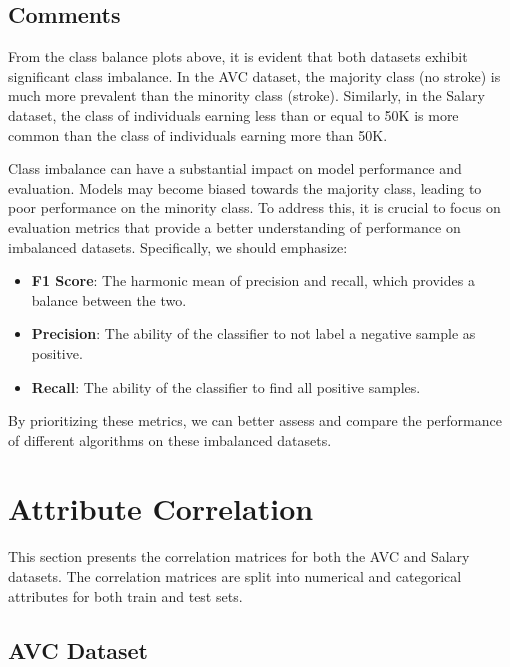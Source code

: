 \documentclass[a4paper,12pt]{article}
\begin{document}
\subsection{Comments}
From the class balance plots above, it is evident that both datasets exhibit significant class imbalance. In the AVC dataset, the majority class (no stroke) is much more prevalent than the minority class (stroke). Similarly, in the Salary dataset, the class of individuals earning less than or equal to 50K is more common than the class of individuals earning more than 50K.

Class imbalance can have a substantial impact on model performance and evaluation. Models may become biased towards the majority class, leading to poor performance on the minority class. To address this, it is crucial to focus on evaluation metrics that provide a better understanding of performance on imbalanced datasets. Specifically, we should emphasize:

\begin{itemize}
    \item \textbf{F1 Score}: The harmonic mean of precision and recall, which provides a balance between the two.
    \item \textbf{Precision}: The ability of the classifier to not label a negative sample as positive.
    \item \textbf{Recall}: The ability of the classifier to find all positive samples.
\end{itemize}

By prioritizing these metrics, we can better assess and compare the performance of different algorithms on these imbalanced datasets.

\newpage
\section{Attribute Correlation}
This section presents the correlation matrices for both the AVC and Salary datasets. The correlation matrices are split into numerical and categorical attributes for both train and test sets.

\subsection{AVC Dataset}
\end{document}

